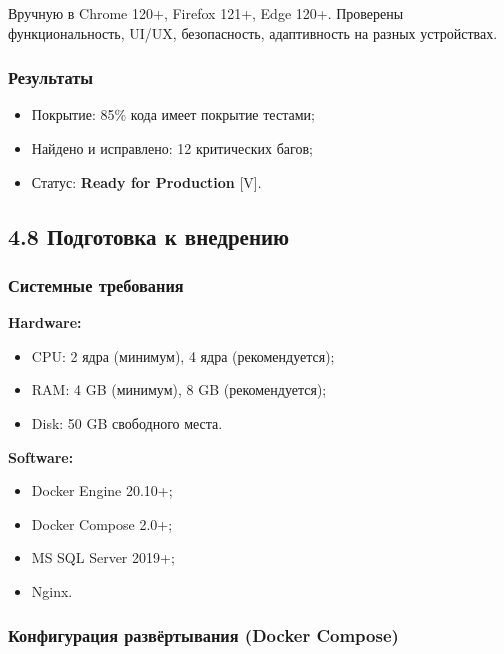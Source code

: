 Вручную в Chrome 120+, Firefox 121+, Edge 120+. Проверены функциональность, UI/UX, безопасность, адаптивность на разных устройствах.

\subsubsection{Результаты}

\begin{itemize}
    \item Покрытие: 85\% кода имеет покрытие тестами;
    \item Найдено и исправлено: 12 критических багов;
    \item Статус: \textbf{Ready for Production} [V].
\end{itemize}


\subsection{4.8 Подготовка к внедрению}

\subsubsection{Системные требования}

\textbf{Hardware:}
\begin{itemize}
    \item CPU: 2 ядра (минимум), 4 ядра (рекомендуется);
    \item RAM: 4 GB (минимум), 8 GB (рекомендуется);
    \item Disk: 50 GB свободного места.
\end{itemize}

\textbf{Software:}
\begin{itemize}
    \item Docker Engine 20.10+;
    \item Docker Compose 2.0+;
    \item MS SQL Server 2019+;
    \item Nginx.
\end{itemize}

\subsubsection{Конфигурация развёртывания (Docker Compose)}

